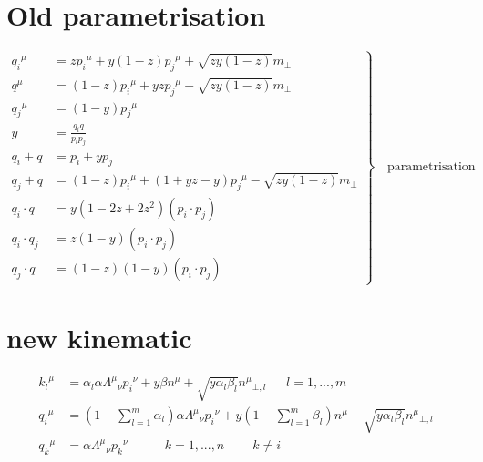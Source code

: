 \section{Old parametrisation}

	
\begin{equation}
	\left.\begin{aligned}
	{q_i}^{\mu} &= z{p_i}^{\mu} + y(1-z){p_j}^{\mu} + \sqrt{zy(1-z)}{m}_{\bot} \\
	{q}^{\mu}   &= (1-z){p_i}^{\mu} + yz {p_j}^{\mu} - \sqrt{zy(1-z)}{m}_{\bot} \\
	{q_j}^{\mu} &= (1-y) {p_j}^{\mu} \\
		y       &= \frac{q_i q}{p_i p_j} \\
q_i +q      &= p_i + yp_j \\
q_j +q      &= (1-z){p_i}^{\mu} + (1+yz-y) {p_j}^{\mu} - \sqrt{zy(1-z)}{m}_{\bot}\\
q_i \cdot q &= y(1-2z+2z^2)(p_i \cdot p_j)\\
q_i \cdot q_j &= z(1-y) (p_i \cdot p_j)\\
q_j \cdot q &= (1-z)(1-y) (p_i \cdot p_j)
		\end{aligned}
	\right\}
	\quad \text{parametrisation}
\end{equation}


\section{new kinematic}
\begin{equation}
	\begin{aligned}
	{k_l}^{\mu} &= \alpha_l \alpha {\Lambda^{\mu}}_{\nu}{p_i}^{\nu} + y\beta{n}^{\mu} + \sqrt{y\alpha_l\beta_l}{n^{\mu}}_{\bot,l} \:\:\:\:\:\:\:{l=1,...,m} \\
	{q_i}^{\mu}   &= (1-\displaystyle\sum\limits_{l=1}^m \alpha_l) \alpha {\Lambda^{\mu}}_{\nu}{p_i}^{\nu} + y(1-\displaystyle\sum\limits_{l=1}^m \beta_l){n}^{\mu} - \sqrt{y\alpha_l\beta_l}{n^{\mu}}_{\bot,l} \\
	{q_k}^{\mu} &= \alpha {\Lambda^{\mu}}_{\nu}{p_k}^{\nu} \:\:\:\:\:\:\:\:\:\:\:\:\: {k=1,...,n}\:\:\:\:\:\:\:\:\:\:k\neq i\\
    \end{aligned}
\end{equation}

